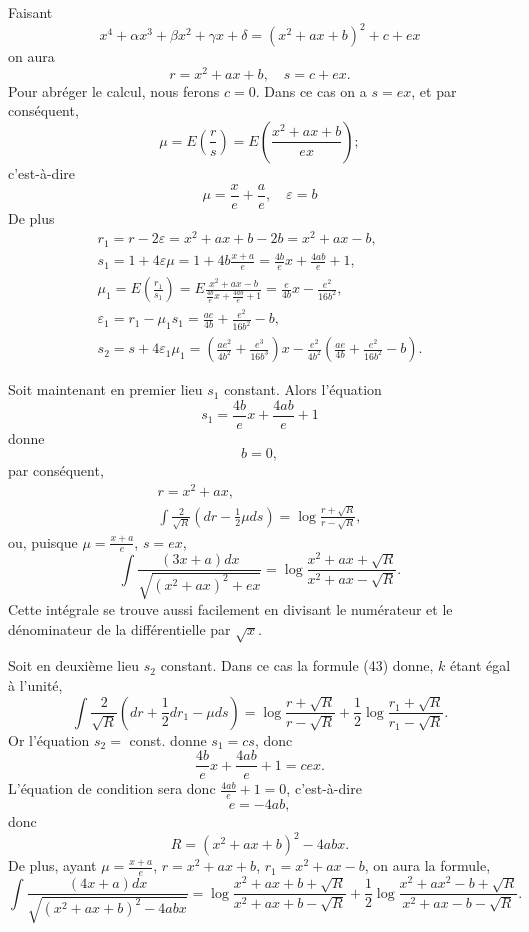 \documentclass[oneside, 12 pt, leqno]{memoir}
\begin{document}
Faisant
\[x^4+\alpha x^3+\beta x^2+\gamma x+\delta=\left(x^2+a x+b\right)^2+c+e x\]
on aura
\[r=x^2+a x+b, \quad s=c+e x.\]
Pour abréger le calcul, nous ferons \(c=0\). Dans ce cas on a \(s=e x\), et par conséquent,
\[\mu=E\left(\frac{r}{s}\right)=E\left(\frac{x^2+a x+b}{e x}\right);\]
c'est-à-dire
\[\mu=\frac{x}{e}+\frac{a}{e}, \quad \varepsilon=b\]
De plus
\[\begin{gathered}
r_1=r-2 \varepsilon=x^2+a x+b-2 b=x^2+a x-b,\\
s_1=1+4 \varepsilon \mu=1+4 b \frac{x+a}{e}=\frac{4 b}{e} x+\frac{4 a b}{e}+1, \\
\mu_1=E\left(\frac{r_1}{s_1}\right)=E \frac{x^2+a x-b}{\frac{4 b}{e} x+\frac{4 a b}{e}+1}=\frac{e}{4 b} x-\frac{e^2}{16 b^2}, \\
\varepsilon_1=r_1-\mu_1 s_1=\frac{a e}{4 b}+\frac{e^2}{16 b^2}-b, \\
s_2=s+4 \varepsilon_1 \mu_1=\left(\frac{a e^2}{4 b^2}+\frac{e^3}{16 b^3}\right) x-\frac{e^2}{4 b^2}\left(\frac{a e}{4 b}+\frac{e^2}{16 b^2}-b\right).
\end{gathered}\]

Soit maintenant en premier lieu \(s_1\) constant. Alors l'équation
\[s_1=\frac{4 b}{e} x+\frac{4 a b}{e}+1\]
donne
\[b=0,\]
par conséquent,
\[\begin{gathered}
r=x^2+a x, \\
\int \frac{2}{\sqrt{R}}\left(d r-\frac{1}{2} \mu d s\right)=\log \frac{r+\sqrt{R}}{r-\sqrt{R}},
\end{gathered}\]
ou, puisque \(\mu=\frac{x+a}{e}\), \(s=e x\),
\[\int \frac{(3 x+a) d x}{\sqrt{\left(x^2+a x\right)^2+e x}}=\log \frac{x^2+a x+\sqrt{R}}{x^2+a x-\sqrt{R}}.\]
Cette intégrale se trouve aussi facilement en divisant le numérateur et le dénominateur de la différentielle par \(\sqrt{x}\).

Soit en deuxième lieu \(s_2\) constant. Dans ce cas la formule (43) donne, \(k\) étant égal à l'unité,
\[\int \frac{2}{\sqrt{R}}\left(d r+\frac{1}{2} d r_1-\mu d s\right)=\log \frac{r+\sqrt{R}}{r-\sqrt{R}}+\frac{1}{2} \log \frac{r_1+\sqrt{R}}{r_1-\sqrt{R}}.\]
Or l'équation \(s_2=\) const. donne \(s_1=c s\), donc
\[\frac{4 b}{e} x+\frac{4 a b}{e}+1=c e x.\]
L'équation de condition sera donc \(\frac{4 a b}{e}+1=0\), c'est-à-dire
\[e=-4 a b,\]
donc
\[R=\left(x^2+a x+b\right)^2-4 a b x.\]
De plus, ayant \(\mu=\frac{x+a}{e}\), \(r=x^2+a x+b\), \(r_1=x^2+a x-b\), on aura la formule,
\[\int \frac{(4 x+a) d x}{\sqrt{\left(x^2+a x+b\right)^2-4 a b x}}=\log \frac{x^2+a x+b+\sqrt{R}}{x^2+a x+b-\sqrt{R}}+\frac{1}{2} \log \frac{x^2+a x^2-b+\sqrt{R}}{x^2+a x-b-\sqrt{R}}.\]
\end{document}
